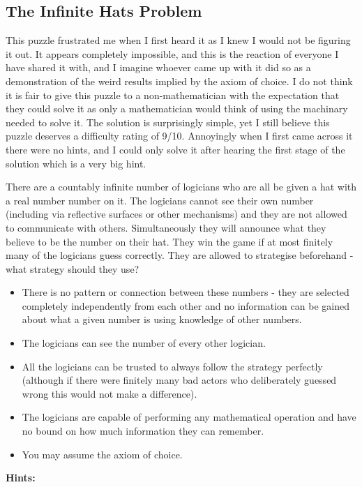 \subsection{The Infinite Hats Problem}

This puzzle frustrated me when I first heard it as I knew I would not be figuring it out. It appears completely impossible, and this is the reaction of everyone I have shared it with, and I imagine whoever came up with it did so as a demonstration of the weird results implied by the axiom of choice. I do not think it is fair to give this puzzle to a non-mathematician with the expectation that they could solve it as only a mathematician would think of using the machinary needed to solve it. The solution is surprisingly simple, yet I still believe this puzzle deserves a difficulty rating of 9/10. Annoyingly when I first came across it there were no hints, and I could only solve it after hearing the first stage of the solution which is a very big hint.

There are a countably infinite number of logicians who are all be given a hat with a real number number on it. The logicians cannot see their own number (including via reflective surfaces or other mechanisms) and they are not allowed to communicate with others. Simultaneously they will announce what they believe to be the number on their hat. They win the game if at most finitely many of the logicians guess correctly. They are allowed to strategise beforehand - what strategy should they use?

\begin{itemize}
	\item There is no pattern or connection between these numbers - they are selected completely independently from each other and no information can be gained about what a given number is using knowledge of other numbers.
	\item The logicians can see the number of every other logician.
	\item All the logicians can be trusted to always follow the strategy perfectly (although if there were finitely many bad actors who deliberately guessed wrong this would not make a difference).
	\item The logicians are capable of performing any mathematical operation and have no bound on how much information they can remember.
	\item You may assume the axiom of choice.
\end{itemize}

\textbf{Hints:}

